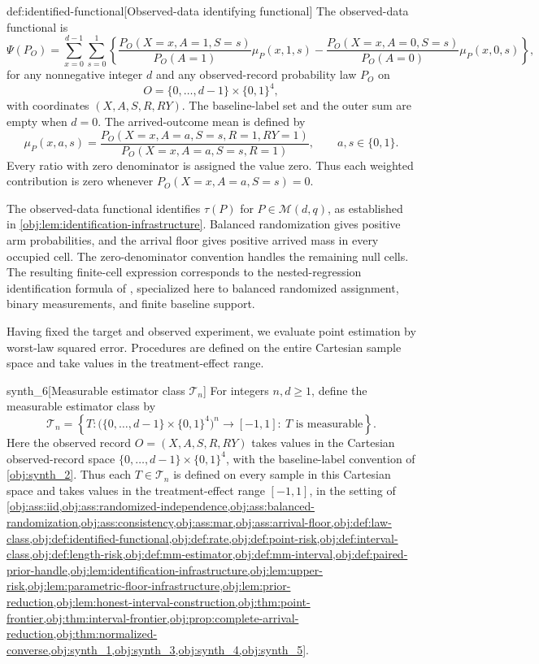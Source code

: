 \begin{definitionv}{def:identified-functional}[Observed-data identifying functional]
The observed-data functional is
\[
\Psi(P_O)
=
\sum_{x=0}^{d-1}\sum_{s=0}^{1}
\left\{
\frac{P_O(X=x,A=1,S=s)}{P_O(A=1)}\mu_P(x,1,s)
-
\frac{P_O(X=x,A=0,S=s)}{P_O(A=0)}\mu_P(x,0,s)
\right\},
\]
for any nonnegative integer \(d\) and any observed-record probability law \(P_O\) on
\[
O=\{0,\ldots,d-1\}\times\{0,1\}^{4},
\]
with coordinates \((X,A,S,R,RY)\). The baseline-label set and the outer sum are empty when \(d=0\). The arrived-outcome mean is defined by
\[
\mu_P(x,a,s)
=
\frac{P_O(X=x,A=a,S=s,R=1,RY=1)}
     {P_O(X=x,A=a,S=s,R=1)},
\qquad a,s\in\{0,1\}.
\]
Every ratio with zero denominator is assigned the value zero. Thus each weighted contribution is zero whenever \(P_O(X=x,A=a,S=s)=0\).
\end{definitionv}

The observed-data functional  identifies \(\tau(P)\) for \(P\in\mathcal M(d,q)\), as established in \cref{obj:lem:identification-infrastructure}. Balanced randomization gives positive arm probabilities, and the arrival floor gives positive arrived mass in every occupied cell. The zero-denominator convention handles the remaining null cells. The resulting finite-cell expression corresponds to the nested-regression identification formula of \href{https://academic.oup.com/jrsssb/article/87/2/480/7829031}{\citet[Lemma~1.1, equation~(10), under Assumptions~1--3]{KallusMao2025}}, specialized here to balanced randomized assignment, binary measurements, and finite baseline support.

Having fixed the target and observed experiment, we evaluate point estimation by worst-law squared error. Procedures are defined on the entire Cartesian sample space and take values in the treatment-effect range.

\begin{definitionv}{synth_6}[Measurable estimator class $\mathcal T_n$]
For integers \(n,d\ge1\), define the measurable estimator class by
\[
\mathcal T_n
=
\left\{
T:\bigl(\{0,\ldots,d-1\}\times\{0,1\}^4\bigr)^n
\longrightarrow[-1,1]
:\ T\text{ is measurable}
\right\}.
\]
Here the observed record \(O=(X,A,S,R,RY)\) takes values in the Cartesian observed-record space \(\{0,\ldots,d-1\}\times\{0,1\}^4\), with the baseline-label convention of \cref{obj:synth_2}. Thus each \(T\in\mathcal T_n\) is defined on every sample in this Cartesian space and takes values in the treatment-effect range \([-1,1]\), in the setting of \cref{obj:ass:iid,obj:ass:randomized-independence,obj:ass:balanced-randomization,obj:ass:consistency,obj:ass:mar,obj:ass:arrival-floor,obj:def:law-class,obj:def:identified-functional,obj:def:rate,obj:def:point-risk,obj:def:interval-class,obj:def:length-risk,obj:def:mm-estimator,obj:def:mm-interval,obj:def:paired-prior-handle,obj:lem:identification-infrastructure,obj:lem:upper-risk,obj:lem:parametric-floor-infrastructure,obj:lem:prior-reduction,obj:lem:honest-interval-construction,obj:thm:point-frontier,obj:thm:interval-frontier,obj:prop:complete-arrival-reduction,obj:thm:normalized-converse,obj:synth_1,obj:synth_3,obj:synth_4,obj:synth_5}.
\end{definitionv}

